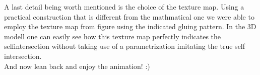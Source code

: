 \documentclass[12pt,            %
               a4paper,         %
               oneside,         %
               DIV12,           %
               fleqn,           %
               halfparskip,     %
               nochapterprefix, %
               bibtotocnumbered,%
              ]{scrartcl} %
\theoremstyle{definition}
\begin{document}
A last detail being worth mentioned is the choice of the texture map. Using a practical construction that is different from the mathmatical one we were able to employ the texture map from figure using the indicated gluing pattern. In the 3D modell one can easily see how this texture map perfectly indicates the selfintersection without taking use of a parametrization imitating the true self intersection. \\

And now lean back and enjoy the animation! :)


\newpage
\nocite{*}


\end{document}
